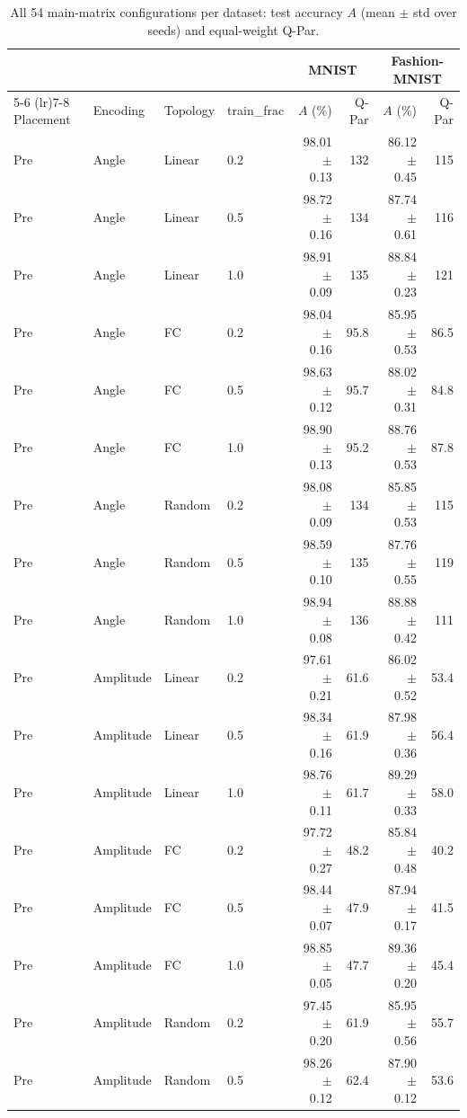 \begin{table}[!t]
\centering
\caption{All 54 main-matrix configurations per dataset: test accuracy $A$ (mean $\pm$ std over seeds) and equal-weight Q-Par.}
\label{tab:full}
\scriptsize
\begin{tabular}{llllrrrr}
\toprule
 &  &  &  & \multicolumn{2}{c}{MNIST} & \multicolumn{2}{c}{Fashion-MNIST} \\
\cmidrule(lr){5-6} \cmidrule(lr){7-8}
Placement & Encoding & Topology & train\_frac & $A$ (\%) & Q-Par & $A$ (\%) & Q-Par \\
\midrule
Pre & Angle & Linear & 0.2 & 98.01 $\pm$ 0.13 & 132 & 86.12 $\pm$ 0.45 & 115 \\
Pre & Angle & Linear & 0.5 & 98.72 $\pm$ 0.16 & 134 & 87.74 $\pm$ 0.61 & 116 \\
Pre & Angle & Linear & 1.0 & 98.91 $\pm$ 0.09 & 135 & 88.84 $\pm$ 0.23 & 121 \\
Pre & Angle & FC & 0.2 & 98.04 $\pm$ 0.16 & 95.8 & 85.95 $\pm$ 0.53 & 86.5 \\
Pre & Angle & FC & 0.5 & 98.63 $\pm$ 0.12 & 95.7 & 88.02 $\pm$ 0.31 & 84.8 \\
Pre & Angle & FC & 1.0 & 98.90 $\pm$ 0.13 & 95.2 & 88.76 $\pm$ 0.53 & 87.8 \\
Pre & Angle & Random & 0.2 & 98.08 $\pm$ 0.09 & 134 & 85.85 $\pm$ 0.53 & 115 \\
Pre & Angle & Random & 0.5 & 98.59 $\pm$ 0.10 & 135 & 87.76 $\pm$ 0.55 & 119 \\
Pre & Angle & Random & 1.0 & 98.94 $\pm$ 0.08 & 136 & 88.88 $\pm$ 0.42 & 111 \\
\midrule
Pre & Amplitude & Linear & 0.2 & 97.61 $\pm$ 0.21 & 61.6 & 86.02 $\pm$ 0.52 & 53.4 \\
Pre & Amplitude & Linear & 0.5 & 98.34 $\pm$ 0.16 & 61.9 & 87.98 $\pm$ 0.36 & 56.4 \\
Pre & Amplitude & Linear & 1.0 & 98.76 $\pm$ 0.11 & 61.7 & 89.29 $\pm$ 0.33 & 58.0 \\
Pre & Amplitude & FC & 0.2 & 97.72 $\pm$ 0.27 & 48.2 & 85.84 $\pm$ 0.48 & 40.2 \\
Pre & Amplitude & FC & 0.5 & 98.44 $\pm$ 0.07 & 47.9 & 87.94 $\pm$ 0.17 & 41.5 \\
Pre & Amplitude & FC & 1.0 & 98.85 $\pm$ 0.05 & 47.7 & 89.36 $\pm$ 0.20 & 45.4 \\
Pre & Amplitude & Random & 0.2 & 97.45 $\pm$ 0.20 & 61.9 & 85.95 $\pm$ 0.56 & 55.7 \\
Pre & Amplitude & Random & 0.5 & 98.26 $\pm$ 0.12 & 62.4 & 87.90 $\pm$ 0.12 & 53.6 \\

\end{tabular}
\end{table}
